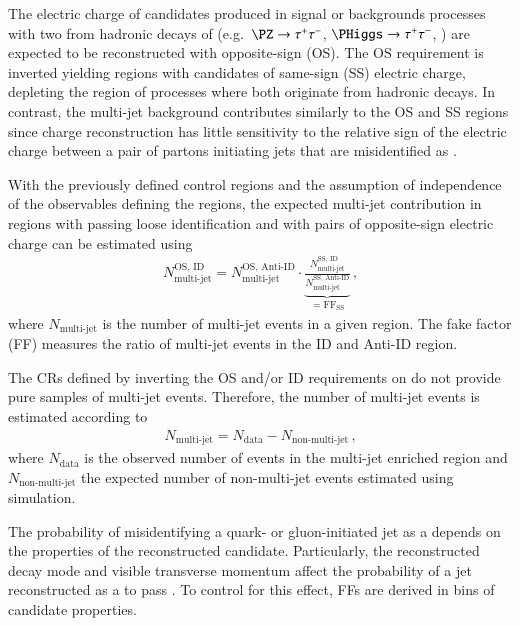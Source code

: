 The electric charge of \tauhadvis candidates produced in signal or
backgrounds processes with two \tauhadvis from hadronic decays of
\tauleptons (e.g.\ $\PZ \to \tautau$, $\PHiggs \to \tautau$, \ttbar)
are expected to be reconstructed with opposite-sign (OS). The OS
requirement is inverted yielding regions with \tauhadvis candidates of
same-sign (SS) electric charge, depleting the region of processes
where both \tauhadvis originate from hadronic \taulepton decays. In
contrast, the multi-jet background contributes similarly to the OS and
SS regions since \tauhadvis charge reconstruction has little
sensitivity to the relative sign of the electric charge between a pair
of partons initiating jets that are misidentified as \tauhadvis.

With the previously defined control regions and the assumption of
independence of the observables defining the regions, the expected
multi-jet contribution in regions with \tauhadvis passing loose
identification and with \tauhadvis pairs of opposite-sign electric
charge can be estimated using
\begin{align*}
  N_\text{multi-jet}^{\text{OS, ID}} =
  N_\text{multi-jet}^{\text{OS, Anti-ID}}
  \cdot
  \underbrace{\frac{N_\text{multi-jet}^{\text{SS, ID}}}
  {N_\text{multi-jet}^{\text{SS, Anti-ID}}}}
  _{= \text{FF}_{\text{SS}}} \,\text{,}
\end{align*}
where $N_\text{multi-jet}$ is the number of multi-jet events in a given
region. The fake factor (FF) measures the ratio of multi-jet events in the ID
and Anti-ID region.%

The CRs defined by inverting the OS and/or ID requirements on \tauhadvis do not
provide pure samples of multi-jet events. Therefore, the number of multi-jet
events is estimated according to
\begin{align*}
  N_\text{multi-jet} = N_\text{data} - N_\text{non-multi-jet} \,\text{,}
\end{align*}
where $N_\text{data}$ is the observed number of events in the
multi-jet enriched region and $N_\text{non-multi-jet}$ the expected
number of non-multi-jet events estimated using simulation.

The probability of misidentifying a quark- or gluon-initiated jet as a
\tauhadvis depends on the properties of the reconstructed \tauhadvis
candidate. Particularly, the reconstructed decay mode and visible transverse
momentum affect the probability of a jet reconstructed as a \tauhadvis to pass
\tauid. To control for this effect, FFs are derived in bins of \tauhadvis
candidate properties.

